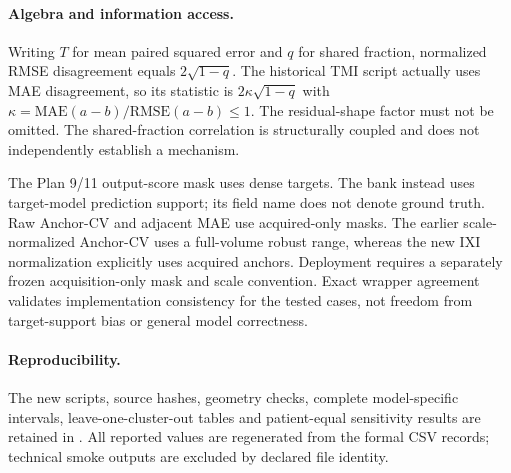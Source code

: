 \paragraph{Algebra and information access.}
Writing $T$ for mean paired squared error and $q$ for shared fraction, normalized RMSE disagreement equals $2\sqrt{1-q}$. The historical TMI script actually uses MAE disagreement, so its statistic is $2\kappa\sqrt{1-q}$ with $\kappa=\mathrm{MAE}(a-b)/\mathrm{RMSE}(a-b)\leq1$. The residual-shape factor must not be omitted. The shared-fraction correlation is structurally coupled and does not independently establish a mechanism.

The Plan 9/11 output-score mask uses dense targets. The bank instead uses target-model prediction support; its field name does not denote ground truth. Raw Anchor-CV and adjacent MAE use acquired-only masks. The earlier scale-normalized Anchor-CV uses a full-volume robust range, whereas the new IXI normalization explicitly uses acquired anchors. Deployment requires a separately frozen acquisition-only mask and scale convention. Exact wrapper agreement validates implementation consistency for the tested cases, not freedom from target-support bias or general model correctness.

\paragraph{Reproducibility.}
The new scripts, source hashes, geometry checks, complete model-specific intervals, leave-one-cluster-out tables and patient-equal sensitivity results are retained in . All reported values are regenerated from the formal CSV records; technical smoke outputs are excluded by declared file identity.
